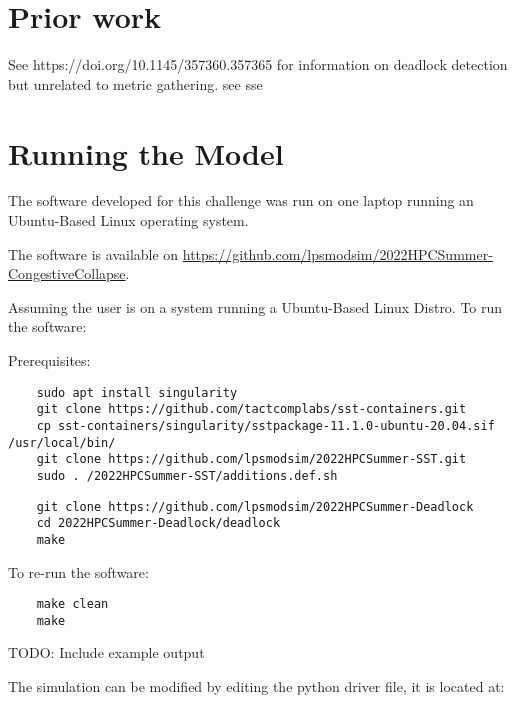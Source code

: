 \documentclass{article}
\begin{document}
\section{Prior work} %

See https://doi.org/10.1145/357360.357365 for information on deadlock detection but unrelated to metric gathering.
see %
sse %

\section{Running the Model}

The software developed for this challenge was run on one laptop running an Ubuntu-Based Linux operating system.

\noindent The software is available on \href{https://github.com/lpsmodsim/2022HPCSummer-CongestiveCollapse}{https://github.com/lpsmodsim/2022HPCSummer-CongestiveCollapse}.\newline

\noindent Assuming the user is on a system running a Ubuntu-Based Linux Distro. To run the software:\newline

\noindent Prerequisites: 

\begin{verbatim}
	sudo apt install singularity
	git clone https://github.com/tactcomplabs/sst-containers.git
	cp sst-containers/singularity/sstpackage-11.1.0-ubuntu-20.04.sif /usr/local/bin/
	git clone https://github.com/lpsmodsim/2022HPCSummer-SST.git
	sudo . /2022HPCSummer-SST/additions.def.sh
\end{verbatim}

\begin{verbatim}
	git clone https://github.com/lpsmodsim/2022HPCSummer-Deadlock
	cd 2022HPCSummer-Deadlock/deadlock
	make
\end{verbatim}

\noindent To re-run the software:

\begin{verbatim}
	make clean
	make
\end{verbatim}

\noindent TODO: Include example output\newline

\noindent The simulation can be modified by editing the python driver file, it is located at:
\end{document}

